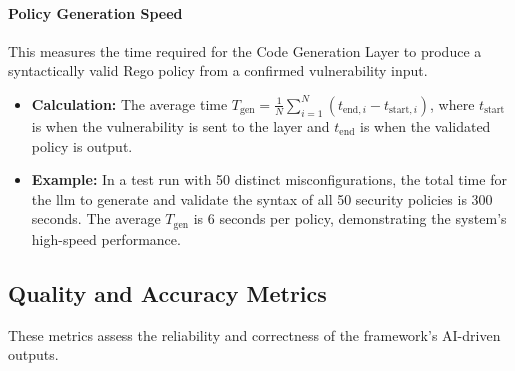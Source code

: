 \paragraph{Policy Generation Speed} This measures the time required for the Code Generation Layer to produce a syntactically valid Rego policy from a confirmed vulnerability input.
\begin{itemize}
    \item \textbf{Calculation:} The average time \( T_{\text{gen}} = \frac{1}{N} \sum_{i=1}^{N} (t_{\text{end},i} - t_{\text{start},i}) \), where \( t_{\text{start}} \) is when the vulnerability is sent to the layer and \( t_{\text{end}} \) is when the validated policy is output.
    \item \textbf{Example:} In a test run with 50 distinct misconfigurations, the total time for the \gls{llm} to generate and validate the syntax of all 50 security policies is 300 seconds. The average \( T_{\text{gen}} \) is 6 seconds per policy, demonstrating the system's high-speed performance.
\end{itemize}


\subsection*{Quality and Accuracy Metrics}
These metrics assess the reliability and correctness of the framework's AI-driven outputs.

